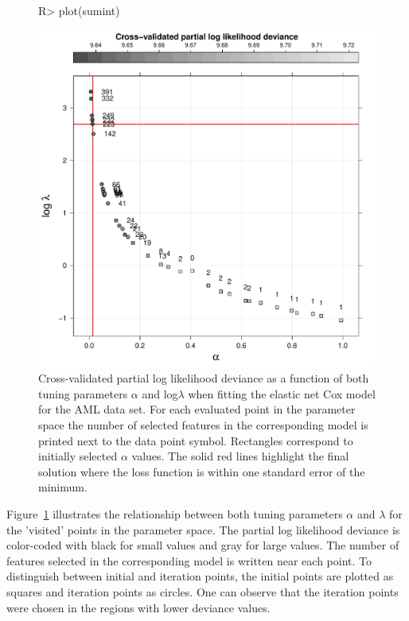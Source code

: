 \documentclass[]{jss}
\begin{document}
\begin{figure}[t!]
\begin{center}
\begin{Schunk}
\begin{Sinput}
R> plot(sumint)
\end{Sinput}
\end{Schunk}
\includegraphics{c060_vignette-interval_search_cox_out_plot1}
\end{center}
\caption{Cross-validated partial log likelihood deviance as a function of both tuning parameters $\alpha$ and log$\lambda$ when fitting the elastic net Cox model for the AML data set. For each evaluated point in the parameter space the number of selected features in the corresponding model is printed next to the data point symbol. Rectangles correspond to initially selected $\alpha$ values. The solid red lines highlight the final solution where the loss function is within one standard error of the minimum. }
\label{fig:interval_search1}
\end{figure}

Figure~\ref{fig:interval_search1} illustrates the relationship between both tuning parameters $\alpha$ and $\lambda$ for the 'visited' points in the parameter space. The partial log likelihood deviance is  color-coded with black for small values and gray for large values.  The number of features selected  in the corresponding model is written near each point. 
To distinguish between initial and iteration points, the initial points are plotted as  squares and iteration points as circles. One can observe that the iteration points were chosen in the regions with lower deviance values.
\end{document}
